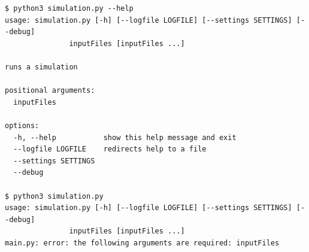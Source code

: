 
\begin{frame}[fragile]
%
\begin{cmdbox}
\begin{verbatim}
$ python3 simulation.py --help
usage: simulation.py [-h] [--logfile LOGFILE] [--settings SETTINGS] [--debug]
               inputFiles [inputFiles ...]

runs a simulation

positional arguments:
  inputFiles

options:
  -h, --help           show this help message and exit
  --logfile LOGFILE    redirects help to a file
  --settings SETTINGS
  --debug

$ python3 simulation.py 
usage: simulation.py [-h] [--logfile LOGFILE] [--settings SETTINGS] [--debug]
               inputFiles [inputFiles ...]
main.py: error: the following arguments are required: inputFiles

\end{verbatim}
\end{cmdbox}
%
\end{frame}


